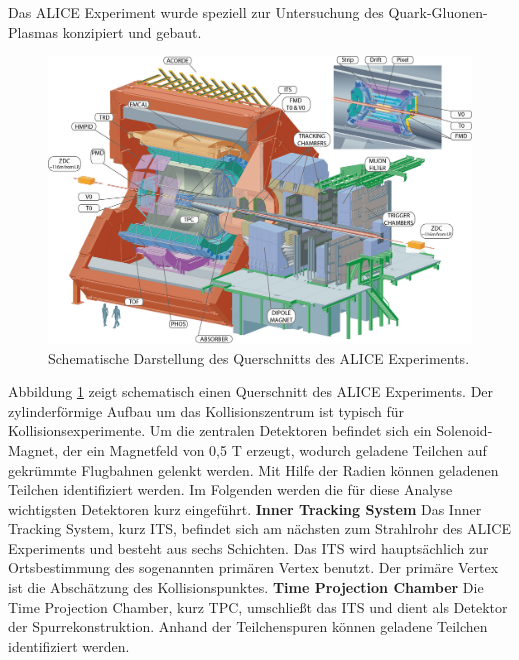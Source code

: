 Das ALICE Experiment wurde speziell zur Untersuchung des Quark-Gluonen-Plasmas konzipiert und gebaut.
\begin{figure}[thp]
\centering
\includegraphics[width=.9\linewidth]{ALICE.jpg}
\caption{Schematische Darstellung des Querschnitts des ALICE Experiments.
\cite{WEBSITE:1}}
\label{fig:ALICE}
\end{figure}
Abbildung \ref{fig:ALICE} zeigt schematisch einen Querschnitt des ALICE Experiments. Der zylinderf\"ormige Aufbau um das Kollisionszentrum ist typisch f\"ur Kollisionsexperimente.
\newline
Um die zentralen Detektoren befindet sich ein Solenoid-Magnet, der ein Magnetfeld von 0,5 T erzeugt, wodurch geladene Teilchen auf gekr\"ummte Flugbahnen gelenkt werden.
Mit Hilfe der Radien k\"onnen geladenen Teilchen identifiziert werden.
Im Folgenden werden die f\"ur diese Analyse wichtigsten Detektoren kurz eingef\"uhrt.
\newline
\textbf{Inner Tracking System}
\newline
Das Inner Tracking System, kurz ITS, befindet sich am n\"achsten zum Strahlrohr des ALICE Experiments und besteht aus sechs Schichten.
Das ITS wird haupts\"achlich zur Ortsbestimmung des sogenannten prim\"aren Vertex benutzt.
Der prim\"are Vertex ist die Absch\"atzung des Kollisionspunktes.
\newline
\textbf{Time Projection Chamber}
\newline
Die Time Projection Chamber, kurz TPC, umschlie{\ss}t das ITS und dient als Detektor der Spurrekonstruktion.
Anhand der Teilchenspuren k\"onnen geladene Teilchen identifiziert werden.
